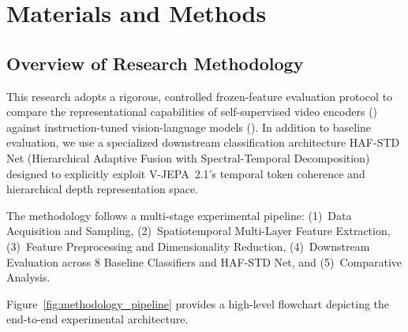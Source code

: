 \chapter{Materials and Methods}

\section{Overview of Research Methodology}

This research adopts a rigorous, controlled frozen-feature evaluation protocol to compare the representational capabilities of self-supervised video encoders (\vjepaa{}) against instruction-tuned vision-language models (\qwenvl{}). In addition to baseline evaluation, we use a specialized downstream classification architecture HAF-STD Net (Hierarchical Adaptive Fusion with Spectral-Temporal Decomposition) designed to explicitly exploit V-JEPA~2.1's temporal token coherence and hierarchical depth representation space.

The methodology follows a multi-stage experimental pipeline: (1)~Data Acquisition and Sampling, (2)~Spatiotemporal Multi-Layer Feature Extraction, (3)~Feature Preprocessing and Dimensionality Reduction, (4)~Downstream Evaluation across 8 Baseline Classifiers and  HAF-STD Net, and (5)~Comparative Analysis.

Figure~\ref{fig:methodology_pipeline} provides a high-level flowchart depicting the end-to-end experimental architecture.

